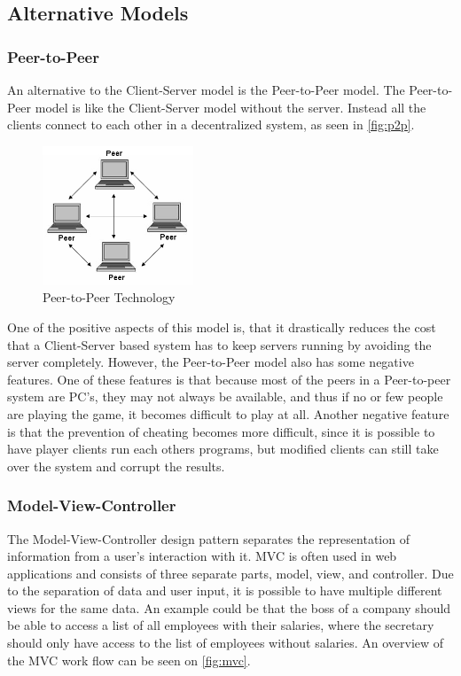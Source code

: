 \subsection{Alternative Models}
\subsubsection{Peer-to-Peer}
An alternative to the Client-Server model is the Peer-to-Peer model.
The Peer-to-Peer model is like the Client-Server model without the server.
Instead all the clients connect to each other in a decentralized system, as seen in \autoref{fig:p2p}.

\begin{figure}[h]
  \centering
    \includegraphics[width=0.4\textwidth]{img/p2p.jpg}
  \caption{Peer-to-Peer Technology \citep{PeerToPeer}}
  \label{fig:p2p}
\end{figure}

One of the positive aspects of this model is, that it drastically reduces the cost that a Client-Server based system has to keep servers running by avoiding the server completely.
However, the Peer-to-Peer model also has some negative features.
One of these features is that because most of the peers in a Peer-to-peer system are PC's, they may not always be available, and thus if no or few people are playing the game, it becomes difficult to play at all.
Another negative feature is that the prevention of cheating becomes more difficult, since it is possible to have player clients run each others programs, but modified clients can still take over the system and corrupt the results.\newline

\subsubsection{Model-View-Controller}
The Model-View-Controller design pattern separates the representation of information from a user's interaction with it.
MVC is often used in web applications and consists of three separate parts, model, view, and controller.
Due to the separation of data and user input, it is possible to have multiple different views for the same data.
An example could be that the boss of a company should be able to access a list of all employees with their salaries, where the secretary should only have access to the list of employees without salaries.
An overview of the MVC work flow can be seen on \autoref{fig:mvc}.\newline

